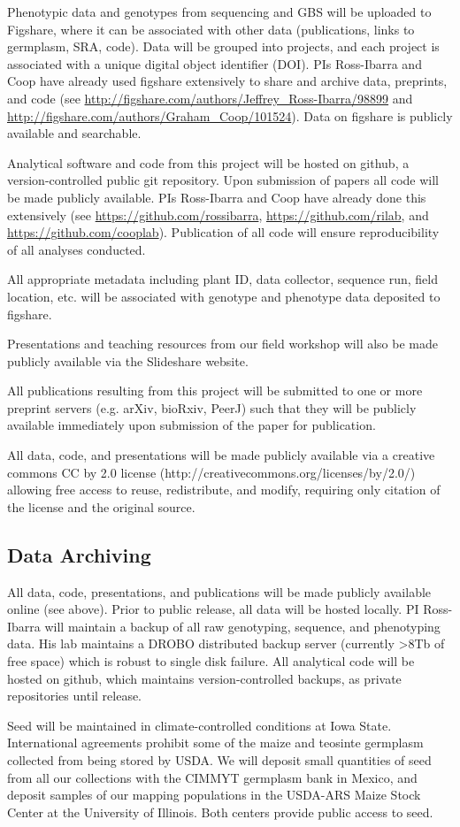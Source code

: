 Phenotypic data and genotypes from sequencing and GBS will be uploaded to Figshare, where it can be associated with other data (publications, links to germplasm, SRA, code). Data will be grouped into projects, and each project is associated with a unique digital object identifier (DOI). PIs Ross-Ibarra and Coop have already used figshare extensively to share and archive data, preprints, and code (see \url{http://figshare.com/authors/Jeffrey_Ross-Ibarra/98899}  and \url{http://figshare.com/authors/Graham_Coop/101524}). Data on figshare is publicly available and searchable.

Analytical software and code from this project will be hosted on github, a version-controlled public git repository.  Upon submission of papers all code will be made publicly available.  PIs Ross-Ibarra and Coop have already done this extensively (see \url{https://github.com/rossibarra}, \url{https://github.com/rilab}, and \url{https://github.com/cooplab}). Publication of all code will ensure reproducibility of all analyses conducted.  

All appropriate metadata including plant ID, data collector, sequence run, field location, etc. will be associated with genotype and phenotype data deposited to figshare. 

Presentations and teaching resources from our field workshop will also be made publicly available via the Slideshare website.

All publications resulting from this project will be submitted to one or more preprint servers (e.g. arXiv, bioRxiv, PeerJ) such that they will be publicly available immediately upon submission of the paper for publication.

All data, code, and presentations will be made publicly available via a creative commons CC by 2.0 license (http://creativecommons.org/licenses/by/2.0/) allowing free access to reuse, redistribute, and modify, requiring only citation of the license and the original source.

\subsection*{Data Archiving}

All data, code, presentations, and publications will be made publicly available online (see above).  Prior to public release, all data will be hosted locally.  PI Ross-Ibarra will maintain a backup of all raw genotyping, sequence, and phenotyping data.  His lab maintains a DROBO distributed backup server (currently >8Tb of free space) which is robust to single disk failure. All analytical code will be hosted on github, which maintains version-controlled backups, as private repositories until release. 

Seed will be maintained in climate-controlled conditions at Iowa State. International agreements prohibit some of the maize and teosinte germplasm collected from being stored by USDA.  We will deposit small quantities of seed from all our collections with the CIMMYT germplasm bank in Mexico, and deposit samples of our mapping populations in the USDA-ARS Maize Stock Center at the University of Illinois.  Both centers provide public access to seed.
